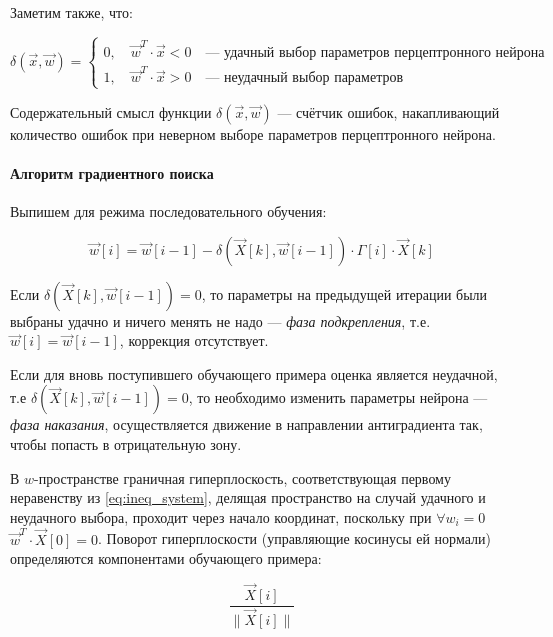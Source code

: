 \documentclass{article}
\numberwithin{equation}{subsection}
\begin{document}
Заметим также, что:

\begin{equation}
    \delta (\vec{x}, \vec{w}) =
    \begin{cases}
        0, \quad \vec{w}^T \cdot \vec{x} < 0 \quad \textrm{--- удачный выбор параметров перцептронного нейрона}\\
        1, \quad \vec{w}^T \cdot \vec{x} > 0 \quad \textrm{--- неудачный выбор параметров}
    \end{cases}
\end{equation}

Содержательный смысл функции $\delta (\vec{x}, \vec{w})$ --- счётчик ошибок,
накапливающий количество ошибок при неверном выборе параметров перцептронного нейрона.





\paragraph{Алгоритм градиентного поиска}

Выпишем для режима последовательного обучения:

\begin{equation}
    \vec{w}[i] = \vec{w}[i-1] - \delta (\vec{X}[k], \vec{w}[i-1]) \cdot \Gamma[i] \cdot \vec{X}[k]
\end{equation}

Если $\delta (\vec{X}[k], \vec{w}[i-1]) = 0$, то параметры на предыдущей итерации были
выбраны удачно и ничего менять не надо --- \textit{фаза подкрепления}, т.е.
$\vec{w}[i] = \vec{w}[i-1]$, коррекция отсутствует.

Если для вновь поступившего обучающего примера оценка является неудачной, т.е
$\delta (\vec{X}[k], \vec{w}[i-1]) = 0$, то необходимо изменить параметры нейрона ---
\textit{фаза наказания}, осуществляется движение в направлении антиградиента так, чтобы
попасть в отрицательную зону.

В $w$-пространстве граничная гиперплоскость, соответствующая первому неравенству 
из \ref{eq:ineq_system}, делящая пространство на случай удачного и неудачного выбора,
проходит через начало координат, поскольку при $\forall w_i = 0$ 
$\vec{w}^T \cdot \vec{X}[0] = 0$. Поворот гиперплоскости (управляющие косинусы ей нормали)
определяются компонентами обучающего примера: 

\begin{equation*}
    \dfrac{\vec{X}[i]}{\|\vec{X}[i]\|}
\end{equation*}
\end{document}
